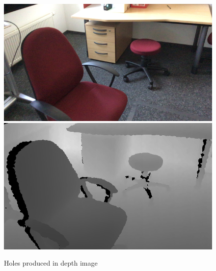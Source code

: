 \begin{figure}[b]
    \includegraphics[scale=0.29]{Figures/RGB.png} \includegraphics[scale=0.37]{Figures/Depth.png}
    \caption{Holes produced in depth image}
    \label{fig:holes2}
\end{figure}
